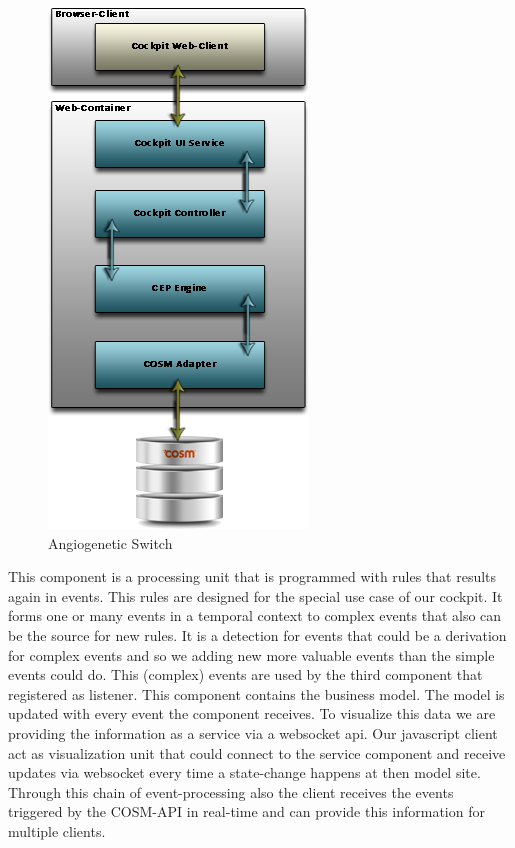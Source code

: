 \documentclass{acm_proc_article-sp}
\begin{document}
\begin{figure}[h]
	\begin{center}
		\includegraphics[scale=0.5]{Component-Overview.png}
		\caption[Angiogenetic Switch]{Angiogenetic Switch}
		\label{fig:AngiogeneticSwitch}
	\end{center}
\end{figure}

This component is a processing unit that is programmed with rules that results again in events. This rules are designed for the special use case of our cockpit. It forms one or many events in a temporal context to complex events that also can be the source for new rules. It is a detection for events that could be a derivation for complex events and so we adding new more valuable events than the simple events could do.
This (complex) events are used by the third component that registered as listener.
This component contains the business model. The model is updated with every event the component receives. 
To visualize this data we are providing the information as a service via a websocket api.
Our javascript client act as visualization unit that could connect to the service component and receive updates via websocket every time a state-change happens at then model site.
Through this chain of event-processing also the client receives the events triggered by the COSM-API in real-time and can provide this information for multiple clients.
\end{document}
